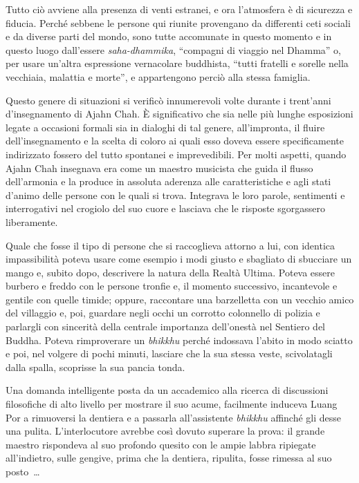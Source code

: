 Tutto ciò avviene alla presenza di venti estranei, e ora l'atmosfera è
di sicurezza e fiducia. Perché sebbene le persone qui riunite provengano
da differenti ceti sociali e da diverse parti del mondo, sono tutte
accomunate in questo momento e in questo luogo dall'essere
\emph{saha-dhammika}, ``compagni di viaggio nel Dhamma'' o, per usare
un'altra espressione vernacolare buddhista, ``tutti fratelli e sorelle
nella vecchiaia, malattia e morte'', e appartengono perciò alla stessa
famiglia.

Questo genere di situazioni si verificò innumerevoli volte durante i
trent'anni d'insegnamento di Ajahn Chah. È significativo che sia nelle
più lunghe esposizioni legate a occasioni formali sia in dialoghi di tal
genere, all'impronta, il fluire dell'insegnamento e la scelta di coloro
ai quali esso doveva essere specificamente indirizzato fossero del tutto
spontanei e imprevedibili. Per molti aspetti, quando Ajahn Chah
insegnava era come un maestro musicista che guida il flusso dell'armonia
e la produce in assoluta aderenza alle caratteristiche e agli stati
d'animo delle persone con le quali si trova. Integrava le loro parole,
sentimenti e interrogativi nel crogiolo del suo cuore e lasciava che le
risposte sgorgassero liberamente.

Quale che fosse il tipo di persone che si raccoglieva attorno a lui, con
identica impassibilità poteva usare come esempio i modi giusto e
sbagliato di sbucciare un mango e, subito dopo, descrivere la natura
della Realtà Ultima. Poteva essere burbero e freddo con le persone
tronfie e, il momento successivo, incantevole e gentile con quelle
timide; oppure, raccontare una barzelletta con un vecchio amico del
villaggio e, poi, guardare negli occhi un corrotto colonnello di polizia
e parlargli con sincerità della centrale importanza dell'onestà nel
Sentiero del Buddha. Poteva rimproverare un \emph{bhikkhu} perché
indossava l'abito in modo sciatto e poi, nel volgere di pochi minuti,
lasciare che la sua stessa veste, scivolatagli dalla spalla, scoprisse
la sua pancia tonda.

Una domanda intelligente posta da un accademico alla ricerca di
discussioni filosofiche di alto livello per mostrare il suo acume,
facilmente induceva Luang Por a rimuoversi la dentiera e a passarla
all'assistente \emph{bhikkhu} affinché gli desse una pulita.
L'interlocutore avrebbe così dovuto superare la prova: il grande maestro
rispondeva al suo profondo quesito con le ampie labbra ripiegate
all'indietro, sulle gengive, prima che la dentiera, ripulita, fosse
rimessa al suo posto~\ldots{}

